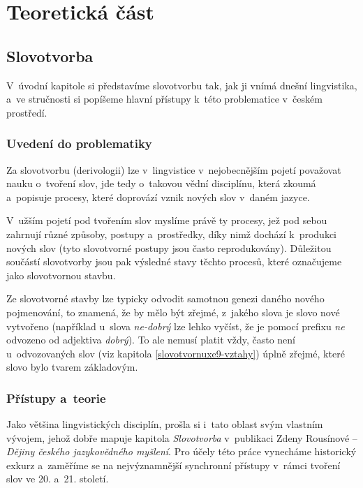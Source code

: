 \part{Teoretická část}

\hypertarget{slovotvorba}{%
\chapter{Slovotvorba}\label{slovotvorba}}

V~úvodní kapitole si představíme slovotvorbu tak, jak ji vnímá dnešní
lingvistika, a~ve stručnosti si popíšeme hlavní přístupy k~této
problematice v~českém prostředí.

\hypertarget{uvedenuxed-do-problematiky}{%
\section{Uvedení do problematiky}\label{uvedenuxed-do-problematiky}}

Za slovotvorbu (derivologii) lze v~lingvistice v~nejobecnějším pojetí
považovat nauku o~tvoření slov, jde tedy o~takovou vědní disciplínu,
která zkoumá a~popisuje procesy, které doprovází vznik nových slov
v~daném jazyce.

V~užším pojetí pod tvořením slov myslíme právě ty procesy, jež pod sebou
zahrnují různé způsoby, postupy a~prostředky, díky nimž dochází
k~produkci nových slov (tyto slovotvorné postupy jsou často
reprodukovány). Důležitou součástí slovotvorby jsou pak výsledné stavy
těchto procesů, které označujeme jako slovotvornou stavbu.
\parencite[92]{dokulil00}

Ze slovotvorné stavby lze typicky odvodit samotnou genezi daného nového
pojmenování, to znamená, že by mělo být zřejmé, z~jakého slova je slovo
nové vytvořeno (například u~slova \emph{ne-dobrý} lze lehko vyčíst, že
je pomocí prefixu \emph{ne} odvozeno od adjektiva \emph{dobrý}). To ale
nemusí platit vždy, často není u~odvozovaných slov (viz kapitola
\ref{slovotvornuxe9-vztahy}) úplně zřejmé, které slovo bylo tvarem
základovým.~\parencite[92--93]{dokulil00}

\hypertarget{pux159uxedstupy-a-teorie}{%
\section{Přístupy a~teorie}\label{pux159uxedstupy-a-teorie}}

Jako většina lingvistických disciplín, prošla si i~tato oblast svým
vlastním vývojem, jehož dobře mapuje kapitola \emph{Slovotvorba}
v~publikaci Zdeny Rousínové -- \emph{Dějiny českého jazykovědného
myšlení}. Pro účely této práce vynecháme historický exkurz a~zaměříme se
na nejvýznamnější synchronní přístupy v~rámci tvoření slov ve 20. a~21.
století.


